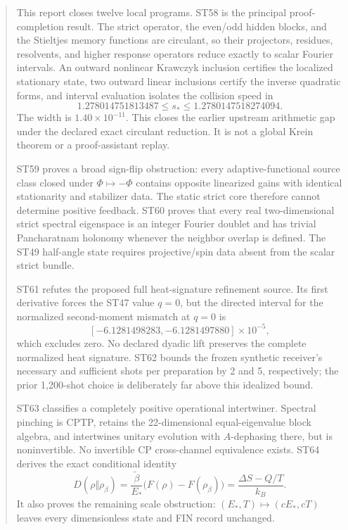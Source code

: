 \documentclass[11pt,a4paper]{article}
\begin{document}
\begin{abstract}
This report closes twelve local programs. ST58 is the principal proof-completion result. The strict operator, the even/odd hidden blocks, and the Stieltjes memory functions are circulant, so their projectors, residues, resolvents, and higher response operators reduce exactly to scalar Fourier intervals. An outward nonlinear Krawczyk inclusion certifies the localized stationary state, two outward linear inclusions certify the inverse quadratic forms, and interval evaluation isolates the collision speed in
\[
1.278014751813487\le s_*\le1.2780147518274094.
\]
The width is $1.40\times10^{-11}$. This closes the earlier upstream arithmetic gap under the declared exact circulant reduction. It is not a global Krein theorem or a proof-assistant replay.

ST59 proves a broad sign-flip obstruction: every adaptive-functional source class closed under $\Phi\mapsto-\Phi$ contains opposite linearized gains with identical stationarity and stabilizer data. The static strict core therefore cannot determine positive feedback. ST60 proves that every real two-dimensional strict spectral eigenspace is an integer Fourier doublet and has trivial Pancharatnam holonomy whenever the neighbor overlap is defined. The ST49 half-angle state requires projective/spin data absent from the scalar strict bundle.

ST61 refutes the proposed full heat-signature refinement source. Its first derivative forces the ST47 value $q=0$, but the directed interval for the normalized second-moment mismatch at $q=0$ is
\[
[-6.1281498283,-6.1281497880]\times10^{-5},
\]
which excludes zero. No declared dyadic lift preserves the complete normalized heat signature. ST62 bounds the frozen synthetic receiver's necessary and sufficient shots per preparation by 2 and 5, respectively; the prior 1,200-shot choice is deliberately far above this idealized bound.

ST63 classifies a completely positive operational intertwiner. Spectral pinching is CPTP, retains the 22-dimensional equal-eigenvalue block algebra, and intertwines unitary evolution with $A$-dephasing there, but is noninvertible. No invertible CP cross-channel equivalence exists. ST64 derives the exact conditional identity
\[
D(\rho\Vert\rho_\beta)=\frac{\widetilde\beta}{E_*}\bigl(F(\rho)-F(\rho_\beta)\bigr)
=\frac{\Delta S-Q/T}{k_B}.
\]
It also proves the remaining scale obstruction: $(E_*,T)\mapsto(cE_*,cT)$ leaves every dimensionless state and FIN record unchanged.


\end{abstract}
\end{document}
